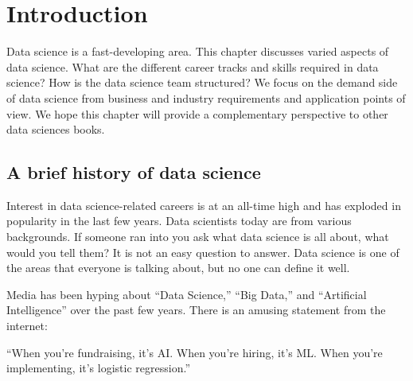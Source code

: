 \documentclass[12pt,]{krantz}
\renewenvironment{quote}{\begin{VF}}{\end{VF}}
\begin{document}
\mainmatter

\hypertarget{introduction}{%
\chapter{Introduction}\label{introduction}}

Data science is a fast-developing area. This chapter discusses varied aspects of data science. What are the different career tracks and skills required in data science? How is the data science team structured? We focus on the demand side of data science from business and industry requirements and application points of view. We hope this chapter will provide a complementary perspective to other data sciences books.

\hypertarget{a-brief-history-of-data-science}{%
\section{A brief history of data science}\label{a-brief-history-of-data-science}}

Interest in data science-related careers is at an all-time high and has exploded in popularity in the last few years. Data scientists today are from various backgrounds. If someone ran into you ask what data science is all about, what would you tell them? It is not an easy question to answer. Data science is one of the areas that everyone is talking about, but no one can define it well.

Media has been hyping about ``Data Science,'' ``Big Data,'' and ``Artificial Intelligence'' over the past few years. There is an amusing statement from the internet:

\begin{quote}
``When you're fundraising, it's AI. When you're hiring, it's ML. When you're implementing, it's logistic regression.''
\end{quote}
\end{document}
